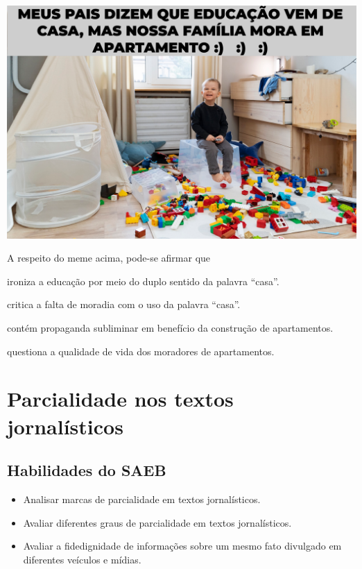 \includegraphics[width=\textwidth]{./imgSAEB_7_POR/media/image7.png}

A respeito do meme acima, pode-se afirmar que

\begin{escolha}
    
    \item ironiza a educação por meio do duplo sentido da palavra ``casa''.
    
    \item critica a falta de moradia com o uso da palavra ``casa''.
    
    \item contém propaganda subliminar em benefício da construção de apartamentos.
    
    \item questiona a qualidade de vida dos moradores de apartamentos.

\end{escolha}

\chapter{Parcialidade nos textos jornalísticos}

\section*{Habilidades do SAEB}

\begin{itemize}

  \item Analisar marcas de parcialidade em textos jornalísticos.

  \item Avaliar diferentes graus de parcialidade em textos jornalísticos.

  \item Avaliar a fidedignidade de informações sobre um mesmo fato divulgado 
  em diferentes veículos e mídias.

\end{itemize}

